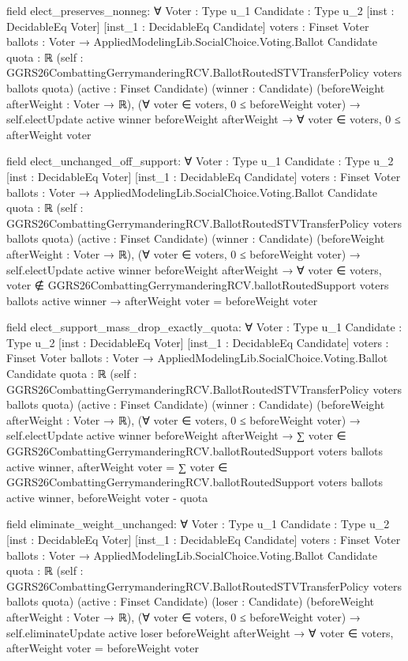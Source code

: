 \documentclass[10pt]{article}
\begin{document}
\begin{ReviewVerbatim}
field elect_preserves_nonneg:
∀ {Voter : Type u_1} {Candidate : Type u_2} [inst : DecidableEq Voter] [inst_1 : DecidableEq Candidate]
  {voters : Finset Voter} {ballots : Voter → AppliedModelingLib.SocialChoice.Voting.Ballot Candidate} {quota : ℝ}
  (self : GGRS26CombattingGerrymanderingRCV.BallotRoutedSTVTransferPolicy voters ballots quota)
  (active : Finset Candidate) (winner : Candidate) (beforeWeight afterWeight : Voter → ℝ),
  (∀ voter ∈ voters, 0 ≤ beforeWeight voter) →
    self.electUpdate active winner beforeWeight afterWeight → ∀ voter ∈ voters, 0 ≤ afterWeight voter

field elect_unchanged_off_support:
∀ {Voter : Type u_1} {Candidate : Type u_2} [inst : DecidableEq Voter] [inst_1 : DecidableEq Candidate]
  {voters : Finset Voter} {ballots : Voter → AppliedModelingLib.SocialChoice.Voting.Ballot Candidate} {quota : ℝ}
  (self : GGRS26CombattingGerrymanderingRCV.BallotRoutedSTVTransferPolicy voters ballots quota)
  (active : Finset Candidate) (winner : Candidate) (beforeWeight afterWeight : Voter → ℝ),
  (∀ voter ∈ voters, 0 ≤ beforeWeight voter) →
    self.electUpdate active winner beforeWeight afterWeight →
      ∀ voter ∈ voters,
        voter ∉ GGRS26CombattingGerrymanderingRCV.ballotRoutedSupport voters ballots active winner →
          afterWeight voter = beforeWeight voter

field elect_support_mass_drop_exactly_quota:
∀ {Voter : Type u_1} {Candidate : Type u_2} [inst : DecidableEq Voter] [inst_1 : DecidableEq Candidate]
  {voters : Finset Voter} {ballots : Voter → AppliedModelingLib.SocialChoice.Voting.Ballot Candidate} {quota : ℝ}
  (self : GGRS26CombattingGerrymanderingRCV.BallotRoutedSTVTransferPolicy voters ballots quota)
  (active : Finset Candidate) (winner : Candidate) (beforeWeight afterWeight : Voter → ℝ),
  (∀ voter ∈ voters, 0 ≤ beforeWeight voter) →
    self.electUpdate active winner beforeWeight afterWeight →
      ∑ voter ∈ GGRS26CombattingGerrymanderingRCV.ballotRoutedSupport voters ballots active winner, afterWeight voter =
        ∑ voter ∈ GGRS26CombattingGerrymanderingRCV.ballotRoutedSupport voters ballots active winner,
            beforeWeight voter -
          quota

field eliminate_weight_unchanged:
∀ {Voter : Type u_1} {Candidate : Type u_2} [inst : DecidableEq Voter] [inst_1 : DecidableEq Candidate]
  {voters : Finset Voter} {ballots : Voter → AppliedModelingLib.SocialChoice.Voting.Ballot Candidate} {quota : ℝ}
  (self : GGRS26CombattingGerrymanderingRCV.BallotRoutedSTVTransferPolicy voters ballots quota)
  (active : Finset Candidate) (loser : Candidate) (beforeWeight afterWeight : Voter → ℝ),
  (∀ voter ∈ voters, 0 ≤ beforeWeight voter) →
    self.eliminateUpdate active loser beforeWeight afterWeight →
      ∀ voter ∈ voters, afterWeight voter = beforeWeight voter
\end{ReviewVerbatim}
\end{document}
